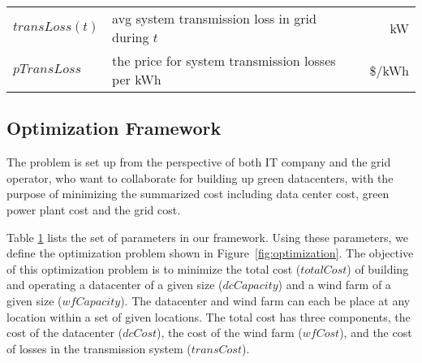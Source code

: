 \begin{table}[ht]
\begin{center}
\begin{tabular}{|l|p{1.9in}|r|}
\hline \hline
$transLoss(t)$  & avg system transmission loss in grid during $t$ & kW \\
$pTransLoss$ & the price for system transmission losses per kWh & \$/kWh \\
\hline
\end{tabular}
\label{tab:par_setting}
\end{center}
\end{table}

\subsection{Optimization Framework}

The problem is set up from the perspective of both IT company and the grid operator, who want to collaborate for building up green datacenters, with the purpose of minimizing the summarized cost including data center cost, green power plant cost and the grid cost.

Table \ref{tab:par_setting} lists the set of parameters in our framework.  Using these parameters, we define the optimization problem shown in Figure~\ref{fig:optimization}.  The objective of this optimization problem is to minimize the total cost ($totalCost$) of building and operating a datacenter of a given size ($dcCapacity$) and a wind farm of a given size ($wfCapacity$).  The datacenter and wind farm can each be place at any location within a set of given locations.  The total cost has three components, the cost of the datacenter ($dcCost$), the cost of the wind farm ($wfCost$), and the cost of losses in the transmission system ($transCost$).

